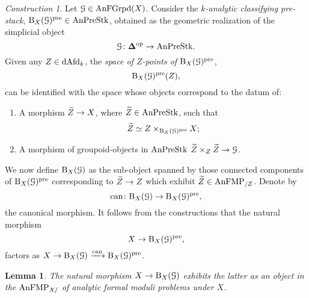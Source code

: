 \documentclass[10pt,a4paper,reqno]{amsart} %
\theoremstyle{plain}
\newtheorem{lem}[thm]{Lemma}
\theoremstyle{definition}
\theoremstyle{remark}
\numberwithin{equation}{section}
\newtheorem{construction}[thm]{Construction}
\begin{document}
\begin{construction} \label{const:formal_classifying_stack_construction}
    Let $\mathcal G \in \mathrm{AnFGrpd}(X)$. Consider the \emph{$k$-analytic classifying pre-stack}, $\mathrm B_X(\mathcal G)^{\mathrm{pre}} \in \mathrm{AnPreStk}$, obtained as the geometric realization
    of the simplicial object
        \[
            \mathcal G \colon \bm{\Delta} ^\mathrm{op} \to \mathrm{AnPreStk}.  
        \]
    Given any $Z \in \mathrm{dAfd}_k$, the \emph{space of $Z$-points of $\mathrm B_X(\mathcal G)^{\mathrm{pre}}$},
        \[
            \mathrm B_X(\mathcal G)^\mathrm{pre}(Z),  
        \]
    can be identified with the space whose objects correspond to the datum of:
        \begin{enumerate}
            \item A morphism $\widetilde Z \to X$, where $\widetilde Z \in \mathrm{AnPreStk}$, such that
                \[
                    \widetilde Z \simeq Z \times_{\mathrm B_X(\mathcal G)^\mathrm{pre}} X;  
                \]
            \item A morphism of groupoid-objects in $\mathrm{AnPreStk}$ $\widetilde Z \times_Z \widetilde Z \to \mathcal G$.
        \end{enumerate}
    We now define $\mathrm B_X(\mathcal G)$ as the sub-object spanned by those connected components of $\mathrm B_X(\mathcal G)^\mathrm{pre}$ corresponding to
    $\widetilde Z \to Z$ which exhibit $\widetilde Z \in \mathrm{AnFMP}_{/Z}$. Denote by
        \[
            \mathrm{can} \colon \mathrm B_X(\mathcal G) \to \mathrm B_X(\mathcal G)^\mathrm{pre},  
        \]
    the canonical morphism. It follows from the constructions that the natural morphism    
        \[
            X \to \mathrm B_X(\mathcal G)^\mathrm{pre},  
        \]
    factors as $X \to \mathrm B_X(\mathcal G) \xrightarrow{\mathrm{can}} \mathrm B_X(\mathcal G)^\mathrm{pre}$.
\end{construction}

\begin{lem}
    The natural morphism $X \to \mathrm B_X(\mathcal G)$ exhibits the latter as an object in the \infcat $\mathrm{AnFMP}_{X/}$ of analytic formal moduli problems
    under $X$.
\end{lem}
\end{document}

